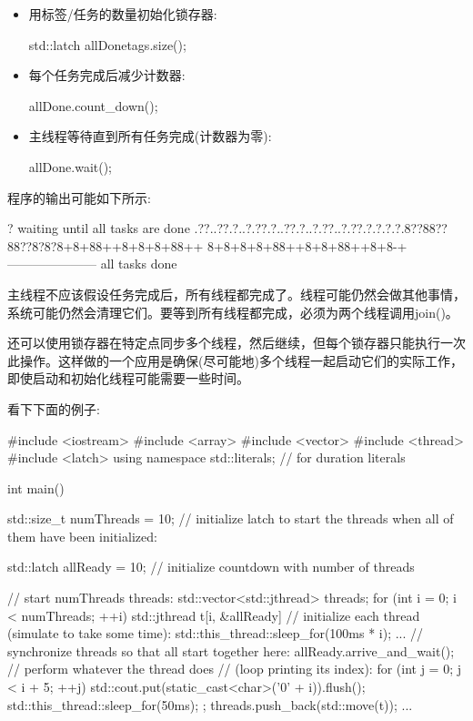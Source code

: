 \begin{itemize}
\item
用标签/任务的数量初始化锁存器:

\begin{cpp}
std::latch allDone{tags.size()};
\end{cpp}

\item
每个任务完成后减少计数器:

\begin{cpp}
allDone.count_down();
\end{cpp}

\item
主线程等待直到所有任务完成(计数器为零):

\begin{cpp}
allDone.wait();
\end{cpp}
\end{itemize}

程序的输出可能如下所示:

\begin{shell}
?
waiting until all tasks are done
.??..??.?..?.??.?..??.?..?.??..?.??.?.?.?.?.8??88??88??8?8?8+8+88++8+8+8+88++
8+8+8+8+88++8+8+88++8+8-+---------------------
all tasks done
\end{shell}

主线程不应该假设任务完成后，所有线程都完成了。线程可能仍然会做其他事情，系统可能仍然会清理它们。要等到所有线程都完成，必须为两个线程调用join()。

还可以使用锁存器在特定点同步多个线程，然后继续，但每个锁存器只能执行一次此操作。这样做的一个应用是确保(尽可能地)多个线程一起启动它们的实际工作，即使启动和初始化线程可能需要一些时间。

看下下面的例子:


\begin{cpp}
#include <iostream>
#include <array>
#include <vector>
#include <thread>
#include <latch>
using namespace std::literals; // for duration literals

int main()
{
	std::size_t numThreads = 10;
	// initialize latch to start the threads when all of them have been initialized:

	std::latch allReady = 10; // initialize countdown with number of threads

	// start numThreads threads:
	std::vector<std::jthread> threads;
	for (int i = 0; i < numThreads; ++i) {
		std::jthread t{[i, &allReady] {
				// initialize each thread (simulate to take some time):
				std::this_thread::sleep_for(100ms * i);
				...
				// synchronize threads so that all start together here:
				allReady.arrive_and_wait();
				// perform whatever the thread does
				// (loop printing its index):
				for (int j = 0; j < i + 5; ++j) {
					std::cout.put(static_cast<char>('0' + i)).flush();
					std::this_thread::sleep_for(50ms);
				}
		}};
		threads.push_back(std::move(t));
	}
	...
}
\end{cpp}

